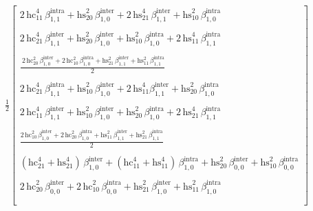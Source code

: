 \documentclass[aps,prb,onecolumn,nofootinbib,citeautoscript,10pt]{revtex4-2}
\begin{document}
{\tiny
\begin{align*}
\frac{1}{2}   \begin{bmatrix}
 2\, \text{hc}_{11}^4 \, \beta_{1,1}^{\text{intra}}+ \text{hs}_{20}^2 \, \beta_{1,0}^{\text{inter}}
 +2\, \text{hs}_{21}^4 \,\beta_{1,1}^{\text{inter}}+ \text{hs}_{10}^2 \, \beta_{1,0}^{\text{intra}} \\ \\
 2\, \text{hc}_{21}^4 \, \beta_{1,1}^{\text{inter}}+ \text{hs}_{20}^2 \, \beta_{1,0}^{\text{inter}}+ \text{hs}_{10}^2 
 \,\beta_{1,0}^{\text{intra}}+2\, \text{hs}_{11}^4 \, \beta_{1,1}^{\text{intra}} \\ \\
 \frac{\ 2\, \text{hc}_{20}^2 \, \beta_{1,0}^{\text{inter}}
 +2\, \text{hc}_{10}^2 \, \beta_{1,0}^{\text{intra}}
 + \text{hs}_{21}^2\, \beta_{1,1}^{\text{inter}}+ \text{hs}_{11}^2 \, \beta_{1,1}^{\text{intra}}
 } {2} \\ \\
 2\, \text{hc}_{21}^4 \, \beta_{1,1}^{\text{intra}}
 + \text{hs}_{10}^2 \, \beta_{1,0}^{\text{inter}}+2\, \text{hs}_{11}^4 \beta
   _{1,1}^{\text{inter}}+ \text{hs}_{20}^2 \, \beta_{1,0}^{\text{intra}} \\ \\
 2\, \text{hc}_{11}^4 \, \beta_{1,1}^{\text{inter}}+ \text{hs}_{10}^2 \, \beta_{1,0}^{\text{inter}}
 + \text{hs}_{20}^2 \, \beta_{1,0}^{\text{intra}}+2\, \text{hs}_{21}^4 \, \beta_{1,1}^{\text{intra}} \\ \\
 \frac{2\, \text{hc}_{10}^2 \, \beta_{1,0}^{\text{inter}}
 +2\, \text{hc}_{20}^2 \, \beta_{1,0}^{\text{intra}}
 + \text{hs}_{11}^2
   \, \beta_{1,1}^{\text{inter}}+ \text{hs}_{21}^2 \, \beta_{1,1}^{\text{intra}}
}{2}    \\ \\
 \left( \text{hc}_{21}^4+ \text{hs}_{21}^4\right) \, \beta_{1,0}^{\text{inter}}
 +\left( \text{hc}_{11}^4+ \text{hs}_{11}^4\right) 
 \,\beta_{1,0}^{\text{intra}}+ \text{hs}_{20}^2 \, \beta_{0,0}^{\text{inter}}
 + \text{hs}_{10}^2 \, \beta_{0,0}^{\text{intra}} \\ \\
 2\, \text{hc}_{20}^2 \, \beta_{0,0}^{\text{inter}}
 +2\, \text{hc}_{10}^2 \, \beta_{0,0}^{\text{intra}}+ \text{hs}_{21}^2 
 \,\beta_{1,0}^{\text{inter}}+ \text{hs}_{11}^2 \, \beta_{1,0}^{\text{intra}} \\ \\

\end{bmatrix}
\end{align*}}
\end{document}
